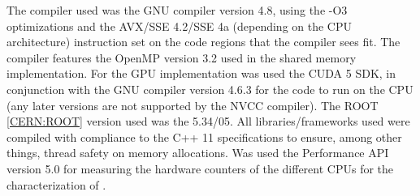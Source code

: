 The compiler used was the GNU compiler version 4.8, using the -O3 optimizations and the AVX/SSE 4.2/SSE 4a (depending on the CPU architecture) instruction set on the code regions that the compiler sees fit. The compiler features the OpenMP version 3.2 used in the shared memory implementation. For the GPU implementation was used the CUDA 5 SDK, in conjunction with the GNU compiler version 4.6.3 for the code to run on the CPU (any later versions are not supported by the \nvidia NVCC compiler). The ROOT \ref{CERN:ROOT} version used was the 5.34/05. All libraries/frameworks used were compiled with compliance to the C++ 11 specifications to ensure, among other things, thread safety on memory allocations. Was used the Performance API version 5.0 for measuring the hardware counters of the different CPUs for the characterization of \ttDilepKinFit.

